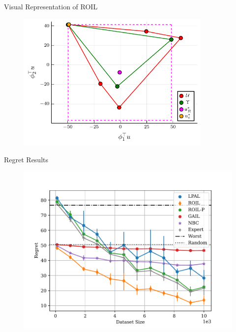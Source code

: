 \documentclass[final,a0paper]{beamer}
\begin{document}
\begin{frame}{}
\begin{columns}[t]
\begin{column}{0.3\linewidth}
    \begin{block}{Visual Representation of ROIL}
        \begin{center}
            \begin{figure}
                \begin{center}
                    \includegraphics[width=0.85\textwidth]{../../pres_roil/plots/visual_solve_cheb.pdf}
                \end{center}
            \end{figure}
        \end{center}
    \end{block}

    \begin{block}{Regret Results}
        \begin{center}
            \begin{figure}
                \includegraphics[scale=1.2]{../../pres_roil/plots/regrets/40x40_gridworld_on_policy_regret_regrets.pdf}
            \end{figure}
        \end{center}
    \end{block}
  \end{column}


\end{columns}
\end{frame}
\end{document}
